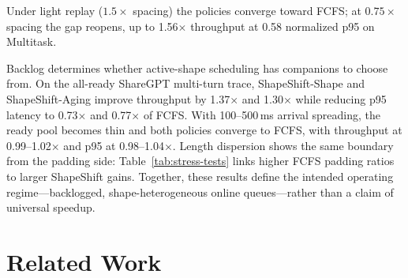 \documentclass[a4paper]{llncs}
\begin{document}
\begin{table}[t]
\centering
\caption{Burst-replay validation. Each cell reports throughput speedup over FCFS and p95 latency normalized to FCFS.}
\label{tab:burst-replay}
\scriptsize
\setlength{\tabcolsep}{3.2pt}
\end{table}

Under light replay ($1.5\times$ spacing) the policies converge toward FCFS; at $0.75\times$ spacing the gap reopens, up to 1.56$\times$ throughput at 0.58 normalized p95 on Multitask. 

Backlog determines whether active-shape scheduling has companions to choose from. On the all-ready ShareGPT multi-turn trace, ShapeShift-Shape and ShapeShift-Aging improve throughput by 1.37$\times$ and 1.30$\times$ while reducing p95 latency to 0.73$\times$ and 0.77$\times$ of FCFS. With 100--500\,ms arrival spreading, the ready pool becomes thin and both policies converge to FCFS, with throughput at 0.99--1.02$\times$ and p95 at 0.98--1.04$\times$. Length dispersion shows the same boundary from the padding side: Table~\ref{tab:stress-tests} links higher FCFS padding ratios to larger ShapeShift gains. Together, these results define the intended operating regime---backlogged, shape-heterogeneous online queues---rather than a claim of universal speedup.

\section{Related Work}
\end{document}
